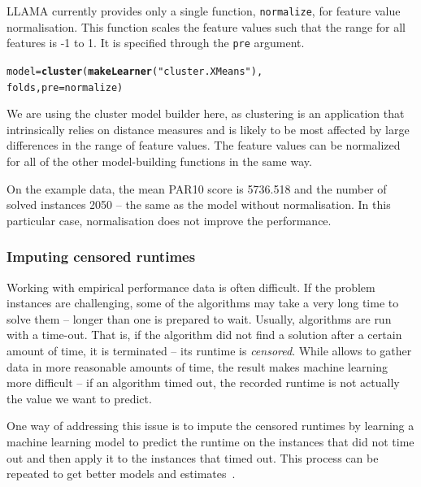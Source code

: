 \documentclass{article}\usepackage[]{graphicx}\usepackage[]{color}
\makeatletter
\newcommand{\hlstr}[1]{\textcolor[rgb]{0.192,0.494,0.8}{#1}}%
\newcommand{\hlstd}[1]{\textcolor[rgb]{0.345,0.345,0.345}{#1}}%
\newcommand{\hlkwb}[1]{\textcolor[rgb]{0.69,0.353,0.396}{#1}}%
\newcommand{\hlkwc}[1]{\textcolor[rgb]{0.333,0.667,0.333}{#1}}%
\newcommand{\hlkwd}[1]{\textcolor[rgb]{0.737,0.353,0.396}{\textbf{#1}}}%
\newenvironment{kframe}{%
 \def\at@end@of@kframe{}%
 \ifinner\ifhmode%
  \def\at@end@of@kframe{\end{minipage}}%
  \begin{minipage}{\columnwidth}%
 \fi\fi%
 \def\FrameCommand##1{\hskip\@totalleftmargin \hskip-\fboxsep
 \colorbox{shadecolor}{##1}\hskip-\fboxsep
     \hskip-\linewidth \hskip-\@totalleftmargin \hskip\columnwidth}%
 \MakeFramed {\advance\hsize-\width
   \@totalleftmargin\z@ \linewidth\hsize
   \@setminipage}}%
 {\par\unskip\endMakeFramed%
 \at@end@of@kframe}
\newenvironment{knitrout}{}{} %
\makeatother
\begin{document}
LLAMA currently provides only a single function, \lstinline{normalize}, for
feature value normalisation. This function scales the feature values such that
the range for all features is -1 to 1. It is specified through the
\lstinline{pre} argument.

\begin{knitrout}
\color{fgcolor}\begin{kframe}
\begin{alltt}
\hlstd{model} \hlkwb{=} \hlkwd{cluster}\hlstd{(}\hlkwd{makeLearner}\hlstd{(}\hlstr{"cluster.XMeans"}\hlstd{),}
    \hlstd{folds,} \hlkwc{pre} \hlstd{= normalize)}
\end{alltt}
\end{kframe}
\end{knitrout}

We are using the cluster model builder here, as clustering is an application
that intrinsically relies on distance measures and is likely to be most affected
by large differences in the range of feature values. The feature values can be
normalized for all of the other model-building functions in the same way.

On the example data, the mean PAR10 score is 5736.518 and the number of solved
instances 2050 -- the same as the model without normalisation. In this
particular case, normalisation does not improve the performance.

\subsubsection{Imputing censored runtimes}

Working with empirical performance data is often difficult. If the problem
instances are challenging, some of the algorithms may take a very long time to
solve them -- longer than one is prepared to wait. Usually, algorithms are run
with a time-out. That is, if the algorithm did not find a solution after a
certain amount of time, it is terminated -- its runtime is \emph{censored}.
While allows to gather data in more reasonable amounts of time, the result makes
machine learning more difficult -- if an algorithm timed out, the recorded
runtime is not actually the value we want to predict.

One way of addressing this issue is to impute the censored runtimes by learning
a machine learning model to predict the runtime on the instances that did not
time out and then apply it to the instances that timed out. This process can be
repeated to get better models and estimates~\cite{schmee_simple_1979}.
\end{document}

